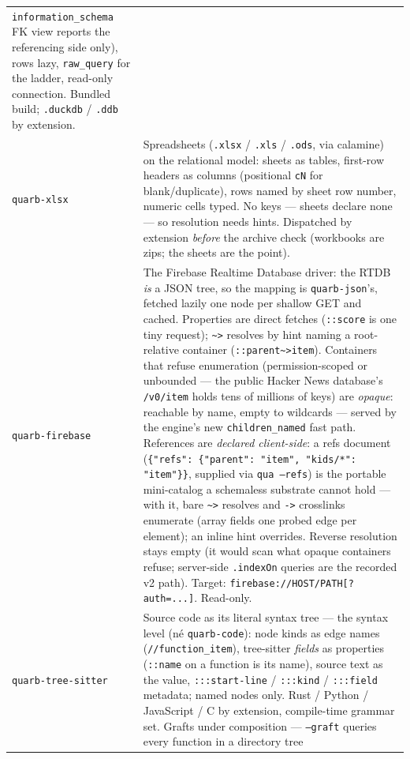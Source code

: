 \documentclass{report}
\begin{document}
\begin{xltabular}{\textwidth}{l X}
  \texttt{information\_schema} FK view reports the referencing
  side only), rows lazy, \texttt{raw\_query} for the ladder,
  read-only connection. Bundled build; \texttt{.duckdb} /
  \texttt{.ddb} by extension. \\
\texttt{quarb-xlsx} & Spreadsheets (\texttt{.xlsx} /
  \texttt{.xls} / \texttt{.ods}, via calamine) on the
  relational model: sheets as tables, first-row headers as
  columns (positional \texttt{cN} for blank/duplicate), rows
  named by sheet row number, numeric cells typed. No keys —
  sheets declare none — so resolution needs hints. Dispatched by
  extension \emph{before} the archive check (workbooks are
  zips; the sheets are the point). \\
\texttt{quarb-firebase} & The Firebase Realtime Database
  driver: the RTDB \emph{is} a JSON tree, so the mapping is
  \texttt{quarb-json}'s, fetched lazily one node per shallow
  GET and cached. Properties are direct fetches
  (\texttt{::score} is one tiny request); \texttt{\textasciitilde>}
  resolves by hint naming a root-relative container
  (\texttt{::parent\textasciitilde>item}). Containers that
  refuse enumeration (permission-scoped or unbounded — the
  public Hacker News database's \texttt{/v0/item} holds tens of
  millions of keys) are \emph{opaque}: reachable by name, empty
  to wildcards — served by the engine's new
  \texttt{children\_named} fast path. References are \emph{declared
  client-side}: a refs document
  (\texttt{\{"refs": \{"parent": "item", "kids/*": "item"\}\}},
  supplied via \texttt{qua --refs}) is the portable mini-catalog
  a schemaless substrate cannot hold — with it, bare
  \texttt{\textasciitilde>} resolves and \texttt{->} crosslinks
  enumerate (array fields one probed edge per element); an inline
  hint overrides. Reverse resolution stays empty (it would scan
  what opaque containers refuse; server-side \texttt{.indexOn}
  queries are the recorded v2 path). Target:
  \texttt{firebase://HOST/PATH[?auth=...]}. Read-only. \\
\texttt{quarb-tree-sitter} & Source code as its literal syntax
  tree — the syntax level (né \texttt{quarb-code}): node kinds
  as edge names (\texttt{//function\_item}), tree-sitter
  \emph{fields} as properties (\texttt{::name} on a function is
  its name), source text as the value, \texttt{:::start-line} /
  \texttt{:::kind} / \texttt{:::field} metadata; named nodes
  only. Rust / Python / JavaScript / C by extension,
  compile-time grammar set. Grafts under composition —
  \texttt{--graft} queries every function in a directory tree

\end{xltabular}
\end{document}

